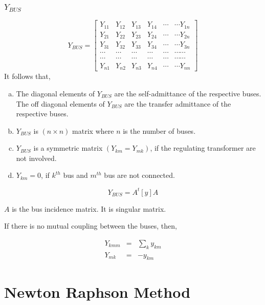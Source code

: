 \documentclass[a4paper,11pt]{article}
\begin{document}
\subsubsection{$Y_{BUS}$}

\begin{displaymath}
Y_{BUS} = \left[ \begin{array}{ccccccc}
Y_{11} & Y_{12} & Y_{13} & Y_{14 } & \cdots & \cdots Y_{1n} \\	
Y_{21} & Y_{22} & Y_{23} & Y_{24 } & \cdots & \cdots Y_{2n} \\
Y_{31} & Y_{32} & Y_{33} & Y_{34 } & \cdots & \cdots Y_{3n} \\
\cdots & \cdots & \cdots & \cdots & \cdots & \cdots \cdots \\
\cdots & \cdots & \cdots & \cdots & \cdots & \cdots \cdots \\
Y_{n1} & Y_{n2} & Y_{n3} & Y_{n4 } & \cdots & \cdots Y_{nn} 
\end{array}
\right]
\end{displaymath}
It follows that,
\begin{enumerate}[a.]
\item The diagonal elements of $Y_{BUS}$ are the self-admittance of the respective buses. The off diagonal elements of $Y_{BUS}$ are the transfer admittance of the respective buses.
\item $Y_{BUS}$ is $(n\times n)$ matrix where $n$ is the number of buses.
\item $Y_{BUS}$ is a symmetric matrix $(Y_{km} = Y_{mk})$, if the regulating transformer are not involved.
\item $Y_{km} = 0$, if $k^{th}$ bus and $m^{th}$ bus are not connected.
\end{enumerate}

\begin{equation}
Y_{BUS} = A^{t}[y]A
\end{equation}

$A$ is the bus incidence matrix. It is singular matrix.

If there is no mutual coupling between the buses, then,

\begin{equation}
\begin{array}{ccc}
Y_{kmm} & = & \sum_{k}^{} y_{km} \\
Y_{mk} & = & -y_{km}
\end{array}
\end{equation}

\section{Newton Raphson Method}
\end{document}

